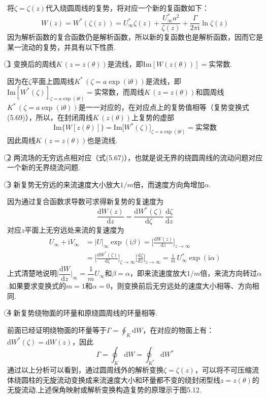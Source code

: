将$\zeta=\zeta(z)$代入绕圆周线的复势，将对应一个新的复函数如下：
\begin{equation*}
W(z)=W^{*}(\zeta(z))=U_\infty^{*}\zeta(z)+\frac{U_\infty^{*}a^{2}}{\zeta(z)}+\frac{\Gamma}{2\pi\mathrm{i}}\ln\zeta(z)
\tag{5.69}
\end{equation*}
因为解析函数的复合函数仍是解析函数，所以新的复函数也是解析函数，因而它是某一流动的复势，并具有以下性质.

\textcircled{1} 变换后的周线$K\,(z=z(\theta))$是流线，即$\mathrm{Im}[W(z(\theta))]=$实常数.

因为在$\zeta$平面上圆周线$K^{*}\,(\zeta=a\exp(\mathrm{i}\theta))$是流线，即$\mathrm{Im}[W^{*}(\zeta)]_{\zeta=a\exp(\mathrm{i}\theta)}=$实常数，而周线$K\,(z=z(\theta))$和圆周线$K^{*}\,(\zeta=a\exp(\mathrm{i}\theta))$是一一对应的，在对应点上的复势值相等（复势变换式(5.69)），所以，在封闭周线$K\,(z(\theta))$上复势的虚部
\[
\mathrm{Im}\{W[z(\theta)]\}=\mathrm{Im}\big[W^{*}(\zeta)\big]_{\zeta=a\exp(\mathrm{i}\theta)}=\text{实常数}
\]
因此周线$K\,(z=z(\theta))$也是流线.

\textcircled{2} 两流场的无穷远点相对应（式(5.67)），也就是说无界的绕圆周线的流动问题对应一个新的无界绕流问题.

\textcircled{3} 新复势无穷远的来流速度大小放大$1/m$倍，而速度方向角增加$\alpha$.

因为通过复合函数求导数可求得新复势的复速度为
\begin{equation*}
\frac{\mathrm{d}W(z)}{\mathrm{d}z}=\frac{\mathrm{d}W^{*}(\zeta)}{\mathrm{d}\zeta}\,\frac{\mathrm{d}\zeta}{\mathrm{d}z}
\tag{5.70}
\end{equation*}
对应$z$平面上无穷远处来流的复速度为
\begin{align*}
U_\infty+\mathrm{i}V_\infty&=|U|_\infty\exp(\mathrm{i}\beta)=\bigg[\frac{\mathrm{d}W(z)}{\mathrm{d}z}\bigg]_{z\to\infty}\\
&=\bigg[\frac{\mathrm{d}W^{*}(\zeta)}{\mathrm{d}\zeta}\bigg]_{\zeta\to\infty}\bigg[\frac{\mathrm{d}\zeta}{\mathrm{d}z}\bigg]_{z\to\infty}=\frac{1}{m}\,U_\infty^{*}\exp(\mathrm{i}\alpha)
\tag{5.71}
\end{align*}
上式清楚地说明$\Big|\dfrac{\mathrm{d}W}{\mathrm{d}z}\Big|_\infty=\dfrac{1}{m}U_\infty$和$\beta=\alpha$，即来流速度放大$1/m$倍，来流方向转过$\alpha$.如果要求变换式的$m=1$和$\alpha=0$，则变换前后无穷远处的速度大小相等、方向相同.

\textcircled{4} 新复势绕物面的环量和原绕圆周线的环量相等.

前面已经证明绕物面的环量等于$\Gamma=\displaystyle\oint_K\mathrm{d}W$，在对应的物面上有：$\mathrm{d}W^{*}(\zeta)=\mathrm{d}W(z)$，因此
\begin{equation*}
\Gamma=\oint_K\mathrm{d}W=\oint_{K^{*}}\mathrm{d}W^{*}
\tag{5.72}
\end{equation*}
通过以上分析可以看到，通过圆周线外的解析变换$\zeta=\zeta(z)$，可以将不可压缩流体绕圆柱的无旋流动变换成来流速度大小和环量都不变的绕封闭型线$z=z(\theta)$的无旋流动.上述保角映射或解析变换构造复势的原理示于图5.12.

